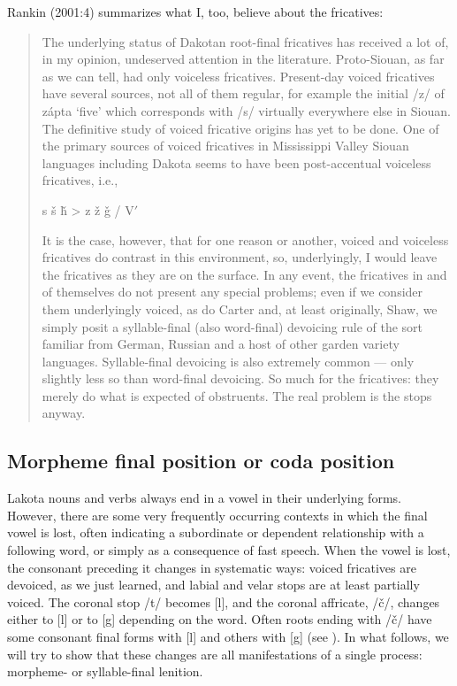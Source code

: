 \documentclass[output=paper]{LSP/langsci}
\begin{document}
Rankin (2001:4) summarizes what I, too, believe about the fricatives:

\begin{quote}The underlying status of Dakotan root-final fricatives has received a lot of, in my opinion, undeserved attention in the literature. Proto-Siouan, as far as we can tell, had only voiceless fricatives. Present-day voiced fricatives have several sources, not all of them regular, for example the initial /z/ of z\'apta `five' which corresponds with /s/ virtually everywhere else in Siouan. The definitive study of voiced fricative origins has yet to be done. One of the primary sources of voiced fricatives in Mississippi Valley Siouan languages including Dakota seems to have been post-accentual voiceless fricatives, i.e.,\vspace{-1em}
\begin{center}
s \v{s} \v{h} > z \v{z} \v{g} / V$'$  \underline{\hspace{1em}}
\end{center}
\vspace{-1em}
It is the case, however, that for one reason or another, voiced and voiceless fricatives do contrast in this environment, so, underlyingly, I would leave the fricatives as they are on the surface. In any event, the fricatives in and of themselves do not present any special problems; even if we consider them underlyingly voiced, as do Carter and, at least originally, Shaw, we simply posit a syllable-final (also word-final) devoicing rule of the sort familiar from German, Russian and a host of other garden variety languages. Syllable-final devoicing is also extremely common --- only slightly less so than word-final devoicing. So much for the fricatives: they merely do what is expected of obstruents. The real problem is the stops anyway.\end{quote}

\subsection{Morpheme final position or coda position}

Lakota nouns and verbs always end in a vowel in their underlying forms. However, there are some very frequently occurring contexts in which the final vowel is lost, often indicating a subordinate or dependent relationship with a following word, or simply as a consequence of fast speech. When the vowel is lost, the consonant preceding it changes in systematic ways: voiced fricatives are devoiced, as we just learned, and labial and velar stops are at least partially voiced. The coronal stop /t/ becomes [l], and the coronal affricate, /\v{c}/, changes either to [l] or to [g] depending on the word. Often roots ending with /\v{c}/ have some consonant final forms with [l] and others with [g] (see ). In what follows, we will try to show that these changes are all manifestations of a single process: morpheme- or syllable-final lenition.
\end{document}
